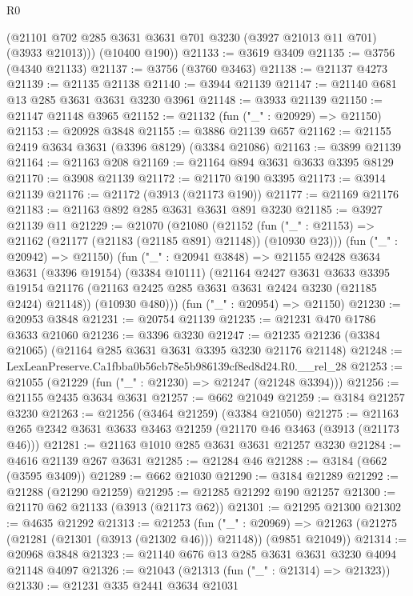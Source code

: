 \begin{lexlean}{R0}
\begin{coremodule}
        (@21101 @702 @285 @3631 @3631 @701 @3230 (@3927 @21013 @11 @701) (@3933 @21013)))
      (@10400 @190))
@21133 := @3619 @3409
@21135 := @3756 (@4340 @21133)
@21137 := @3756 (@3760 @3463)
@21138 := @21137 @4273
@21139 := @21135 @21138
@21140 := @3944 @21139
@21147 := @21140 @681 @13 @285 @3631 @3631 @3230 @3961
@21148 := @3933 @21139
@21150 := @21147 @21148 @3965
@21152 := @21132 (fun ("_" : @20929) => @21150)
@21153 := @20928 @3848
@21155 := @3886 @21139 @657
@21162 := @21155 @2419 @3634 @3631 (@3396 @8129) (@3384 @21086)
@21163 := @3899 @21139
@21164 := @21163 @208
@21169 := @21164 @894 @3631 @3633 @3395 @8129
@21170 := @3908 @21139
@21172 := @21170 @190 @3395
@21173 := @3914 @21139
@21176 := @21172 (@3913 (@21173 @190))
@21177 := @21169 @21176
@21183 := @21163 @892 @285 @3631 @3631 @891 @3230
@21185 := @3927 @21139 @11
@21229 := @21070
    (@21080
      (@21152 (fun ("_" : @21153) => @21162 (@21177 (@21183 (@21185 @891) @21148)) (@10930 @23)))
      (fun ("_" : @20942) => @21150)
      (fun ("_" : @20941 @3848) =>
      @21155
        @2428
        @3634
        @3631
        (@3396 @19154)
        (@3384 @10111)
        (@21164
          @2427
          @3631
          @3633
          @3395
          @19154
          @21176
          (@21163 @2425 @285 @3631 @3631 @2424 @3230 (@21185 @2424) @21148))
        (@10930 @480)))
    (fun ("_" : @20954) => @21150)
@21230 := @20953 @3848
@21231 := @20754 @21139
@21235 := @21231 @470 @1786 @3633 @21060
@21236 := @3396 @3230
@21247 := @21235 @21236 (@3384 @21065) (@21164 @285 @3631 @3631 @3395 @3230 @21176 @21148)
@21248 := LexLeanPreserve.Ca1fbba0b56cb78e5b986139cf8ed8d24.R0.__rel_28
@21253 := @21055 (@21229 (fun ("_" : @21230) => @21247 (@21248 @3394)))
@21256 := @21155 @2435 @3634 @3631
@21257 := @662 @21049
@21259 := @3184 @21257 @3230
@21263 := @21256 (@3464 @21259) (@3384 @21050)
@21275 := @21163 @265 @2342 @3631 @3633 @3463 @21259 (@21170 @46 @3463 (@3913 (@21173 @46)))
@21281 := @21163 @1010 @285 @3631 @3631 @21257 @3230
@21284 := @4616 @21139 @267 @3631
@21285 := @21284 @46
@21288 := @3184 (@662 (@3595 @3409))
@21289 := @662 @21030
@21290 := @3184 @21289
@21292 := @21288 (@21290 @21259)
@21295 := @21285 @21292 @190 @21257
@21300 := @21170 @62 @21133 (@3913 (@21173 @62))
@21301 := @21295 @21300
@21302 := @4635 @21292
@21313 := @21253
    (fun ("_" : @20969) =>
    @21263 (@21275 (@21281 (@21301 (@3913 (@21302 @46))) @21148)) (@9851 @21049))
@21314 := @20968 @3848
@21323 := @21140 @676 @13 @285 @3631 @3631 @3230 @4094 @21148 @4097
@21326 := @21043 (@21313 (fun ("_" : @21314) => @21323))
@21330 := @21231 @335 @2441 @3634 @21031

\end{coremodule}
\end{lexlean}
